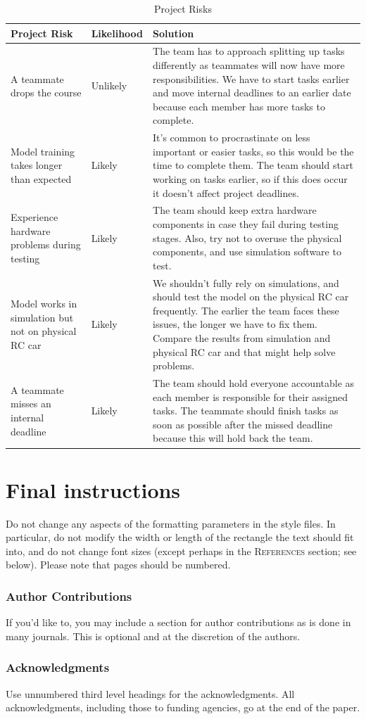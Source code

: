 \documentclass{article} %
\begin{document}
\begin{table}[H]
\caption{Project Risks}
\centering
\begin{tabular}{|p{4cm}|p{2.5cm}|p{7cm}|}
\hline
\textbf{Project Risk} & \textbf{Likelihood} & \textbf{Solution} \\ \hline
A teammate drops the course & Unlikely & The team has to approach splitting up tasks differently as teammates will now have more responsibilities. We have to start tasks earlier and move internal deadlines to an earlier date because each member has more tasks to complete. \\ \hline
Model training takes longer than expected & Likely & It’s common to procrastinate on less important or easier tasks, so this would be the time to complete them. The team should start working on tasks earlier, so if this does occur it doesn’t affect project deadlines. \\ \hline
Experience hardware problems during testing & Likely & The team should keep extra hardware components in case they fail during testing stages. Also, try not to overuse the physical components, and use simulation software to test. \\ \hline
Model works in simulation but not on physical RC car & Likely & We shouldn’t fully rely on simulations, and should test the model on the physical RC car frequently. The earlier the team faces these issues, the longer we have to fix them. Compare the results from simulation and physical RC car and that might help solve problems. \\ \hline
A teammate misses an internal deadline & Likely & The team should hold everyone accountable as each member is responsible for their assigned tasks. The teammate should finish tasks as soon as possible after the missed deadline because this will hold back the team. \\ \hline
\end{tabular}
\end{table}


\section{Final instructions}
Do not change any aspects of the formatting parameters in the style files.
In particular, do not modify the width or length of the rectangle the text
should fit into, and do not change font sizes (except perhaps in the
\textsc{References} section; see below). Please note that pages should be
numbered.


\subsubsection*{Author Contributions}
If you'd like to, you may include  a section for author contributions as is done
in many journals. This is optional and at the discretion of the authors.

\subsubsection*{Acknowledgments}
Use unnumbered third level headings for the acknowledgments. All
acknowledgments, including those to funding agencies, go at the end of the paper.

\label{last_page}



\end{document}

